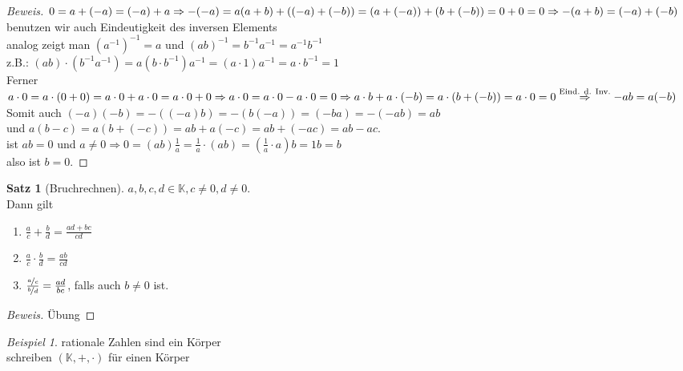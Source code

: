 \documentclass[12pt,a4paper,titlepage]{article} %
\theoremstyle{definition}
\newtheorem{satz}{Satz}[subsection]
\theoremstyle{remark}
\newtheorem*{bsp}{Beispiel}
\newenvironment{bew}{\begin{proof}[Beweis]}{\end{proof}}
\begin{document}
\begin{bew}
	$0 = a + (-a) = (-a) + a\\
	\Rightarrow -(-a) = a\\
	(a+b) + ((-a)+(-b)) = (a+(-a))+(b+(-b))=0+0=0\\
	\Rightarrow -(a+b)=(-a)+(-b)$\\
	benutzen wir auch Eindeutigkeit des inversen Elements\\
	analog zeigt man $(a^{-1})^{-1} = a$ und $(ab)^{-1}= b^{-1}a^{-1}=a^{-1}b^{-1}$\\
	z.B.: $(ab)\cdot (b^{-1}a^{-1})=a(b\cdot b^{-1}) a^{-1} = (a\cdot 1)a^{-1} = a\cdot b^{-1}=1$\\
	Ferner $a\cdot 0 = a\cdot(0+0)=a\cdot 0 + a\cdot 0 = a\cdot 0 + 0\\
	\Rightarrow a\cdot 0 = a\cdot 0 - a\cdot 0 = 0\\
	\Rightarrow a\cdot b + a\cdot (-b) = a\cdot (b+(-b)) = a\cdot 0=0\\
	\overset{\text{Eind. d. Inv.}}{\Rightarrow} -ab=a(-b)$\\
	Somit auch $(-a)(-b) = -((-a)b) = -(b(-a)) = (-ba) = -(-ab) = ab$\\
	und $a(b-c) = a(b+(-c))=ab+a(-c)=ab+(-ac)=ab-ac$.\\
	ist $ab = 0$ und $a\neq 0 \Rightarrow 0=(ab)\frac{1}{a}=\frac{1}{a}\cdot (ab)=(\frac{1}{a}\cdot a)b = 1b = b$\\also ist $b=0$. 
\end{bew}
\begin{satz}[Bruchrechnen]
	$a,b,c,d\in\mathbb{K}, c\neq 0, d\neq 0$.\\
	Dann gilt
	\begin{enumerate}
		\item $\frac{a}{c}+\frac{b}{d}=\frac{ad+bc}{cd}$
		\item $\frac{a}{c}\cdot\frac{b}{d}=\frac{ab}{cd}$
		\item $\frac{\nicefrac{a}{c}}{\nicefrac{b}{d}} = \frac{ad}{bc}$, falls auch $b\neq 0$ ist.
	\end{enumerate}
\end{satz}
\begin{bew}
	Übung
\end{bew}
\begin{bsp}
	rationale Zahlen sind ein Körper\\
	schreiben $(\mathbb{K},+,\cdot)$ für einen Körper
\end{bsp}
\end{document}
